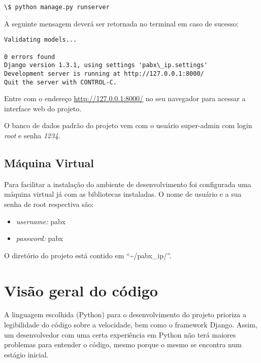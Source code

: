\documentclass[letterpaper,10pt,brazil]{sphinxmanual}
\begin{document}
\begin{Verbatim}[commandchars=\\\{\}]
\$ python manage.py runserver
\end{Verbatim}

A seguinte mensagem deverá ser retornada no terminal em caso de sucesso:

\begin{Verbatim}[commandchars=\\\{\}]
Validating models...

0 errors found
Django version 1.3.1, using settings 'pabx\_ip.settings'
Development server is running at http://127.0.0.1:8000/
Quit the server with CONTROL-C.
\end{Verbatim}

Entre com o endereço \href{http://127.0.0.1:8000/}{http://127.0.0.1:8000/} no seu navegador para acessar a interface web do projeto.

O banco de dados padrão do projeto vem com o usuário super-admin com login \emph{root} e senha \emph{1234}.


\subsection{Máquina Virtual}
\label{inicio:maquina-virtual}
Para facilitar a instalação do ambiente de desenvolvimento foi configurada uma máquina virtual já com as bibliotecas instaladas. O nome de usuário e a sua senha de root respectiva são:
\begin{itemize}
\item {} 
\emph{username:} pabx

\item {} 
\emph{password:} pabx

\end{itemize}

O diretório do projeto está contido em ``\textasciitilde{}/pabx\_ip/''.


\section{Visão geral do código}
\label{codigo::doc}\label{codigo:visao-geral-do-codigo}
A linguagem escolhida (Python) para o desenvolvimento do projeto prioriza a legibilidade do código sobre a velocidade, bem como o framework Django. Assim, um desenvolvedor com uma certa experiência em Python não terá maiores problemas para entender o código, mesmo porque o mesmo se encontra num estágio inicial.
\end{document}
